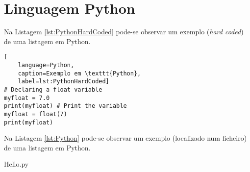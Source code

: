 \chapter{Linguagem Python}
\label{ch:LangPython}

Na Listagem \ref{lst:PythonHardCoded} pode-se observar um exemplo (\textit{hard coded}) de uma listagem em Python.

\begin{lstlisting}[
	language=Python,
	caption=Exemplo em \texttt{Python},
	label=lst:PythonHardCoded]
# Declaring a float variable
myfloat = 7.0
print(myfloat) # Print the variable
myfloat = float(7)
print(myfloat)
\end{lstlisting}

Na Listagem \ref{lst:Python} pode-se observar um exemplo (localizado num ficheiro) de uma listagem em Python.


{Hello.py}
